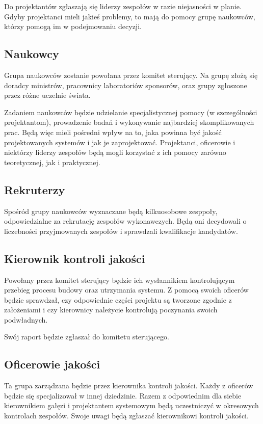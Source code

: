 Do projektantów zgłaszają się liderzy zespołów w razie niejasności w planie.
Gdyby projektanci mieli jakieś problemy, to mają do pomocy grupę naukowców, którzy pomogą im w podejmowaniu decyzji.

\subsection{Naukowcy}
Grupa naukowców zostanie powołana przez komitet sterujący.
Na grupę złożą się doradcy ministrów, pracownicy laboratoriów sponsorów, oraz grupy zgłoszone przez różne uczelnie świata.

Zadaniem naukowców będzie udzielanie specjalistycznej pomocy (w szczególności projektantom), prowadzenie badań i wykonywanie najbardziej skomplikowanych prac. 
Będą więc mieli pośredni wpływ na to, jaka powinna być jakość projektowanych systemów i jak je zaprojektować.
Projektanci, oficerowie i niektórzy liderzy zespołów będą mogli korzystać z ich pomocy zarówno teoretycznej, jak i praktycznej.

\subsection{Rekruterzy}
Spośród grupy naukowców wyznaczane będą kilkuosobowe zesppoły, odpowiedzialne za rekrutację zespołów wykonawczych. Będą oni decydowali o liczebności przyjmowanych zespołów i sprawdzali kwalifikacje kandydatów.

\subsection{Kierownik kontroli jakości}
Powołany przez komitet sterujący będzie ich wysłannikiem kontrolującym przebieg procesu budowy oraz utrzymania systemu.
Z pomocą swoich oficerów będzie sprawdzał, czy odpowiednie części projektu są tworzone zgodnie z założeniami i czy kierownicy należycie kontrolują poczynania swoich podwładnych.

Swój raport będzie zgłaszał do komitetu sterującego.

\subsection{Oficerowie jakości}
Ta grupa zarządzana będzie przez kierownika kontroli jakości.
Każdy z oficerów będzie się specjalizował w innej dziedzinie.
Razem z odpowiednim dla siebie kierownikiem gałęzi i projektantem systemowym będą uczestniczyć w okresowych kontrolach zespołów.
Swoje uwagi będą zgłaszać kierownikowi kontroli jakości.

